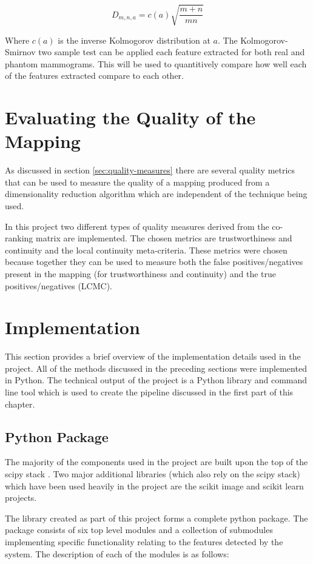 \begin{equation}
	D_{m,n,a} = c(a) \sqrt{ \frac{m+n}{mn} }
\end{equation}

Where $c(a)$ is the inverse Kolmogorov distribution at $a$. The Kolmogorov-Smirnov two sample test can be applied each feature extracted for both real and phantom mammograms. This will be used to quantitively compare how well each of the features extracted compare to each other. 


\section{Evaluating the Quality of the Mapping}
As discussed in section \ref{sec:quality-measures} there are several quality metrics that can be used to measure the quality of a mapping produced from a dimensionality reduction algorithm which are independent of the technique being used.

In this project two different types of quality measures derived from the co-ranking matrix are implemented. The chosen metrics are trustworthiness and continuity and the local continuity meta-criteria. These metrics were chosen because together they can be used to measure both the false positives/negatives present in the mapping (for trustworthiness and continuity) and the true positives/negatives (LCMC). 

\section{Implementation}
\label{sec:implementation}
This section provides a brief overview of the implementation details used in the project. All of the methods discussed in the preceding sections were implemented in Python. The technical output of the project is a Python library and command line tool which is used to create the pipeline discussed in the first part of this chapter.

\subsection{Python Package}
The majority of the components used in the project are built upon the top of the scipy stack \cite{jones2014scipy}. Two major additional libraries (which also rely on the scipy stack) which have been used heavily in the project are the scikit image \cite{van2014scikit} and scikit learn \cite{pedregosa2011scikit} projects.

The library created as part of this project forms a complete python package. The package consists of six top level modules and a collection of submodules implementing specific functionality relating to the features detected by the system. The description of each of the modules is as follows:

